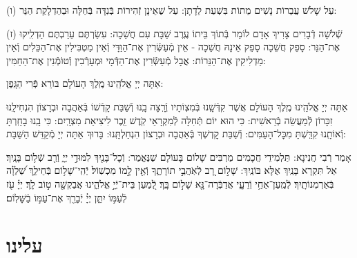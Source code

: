 \documentclass[twoside, openany, parskip=half, 11pt]{book}
\begin{document}
(ו) עַל שָׁלֹשׁ עֲבֵרוֹת נָשִׁים מֵתוֹת בִּשְׁעַת לֵדָתָן: עַל שֶׁאֵינָן זְֿהִירוֹת בְּֿנִדָּה בְּֿחַלָּה וּבְהַדְלָקַת הַנֵּר:

(ז) שְֿׁלֹשָׁה דְֿבָרִים צָרִיךְ אָדָם לוֹמַר בְּֿתוֹךְ בֵּיתוֹ עֶֽרֶב שַׁבָּת עִם חֲשֵׁכָה: עִשַׂרְתֶּם עֵרַבְתֶּם הַדְלִֽיקוּ אֶת־הַנֵּר: סָפֵק חֲשֵׁכָה סָפֵק אֵינָהּ חֲשֵׁכָה - אֵין מְֿעַשְּֿׂרִין אֶת־הַוַּדָּי וְֿאֵין מַטְבִּילִין אֶת־הַכֵּלִים וְֿאֵין מַדְלִיקִין אֶת־הַנֵּרוֹת: אֲבָל מְֿעַשְּֿׂרִין אֶת־הַדְּֿמָי וּמְעָרְֿבִין וְֿטוֹמְֿנִין אֶת־הַחַמִּין:



אַתָּה יְיָ אֱלֹהֵֽינוּ מֶֽלֶךְ הָעוֹלָם בּוֹרֵא פְּֿרִי הַגָּֽפֶן:

אַתָּה יְיָ אֱלֹהֵֽינוּ מֶֽלֶךְ הָעוֹלָם אֲשֶׁר קִדְּֿשָֽׁנוּ בְּֿמִצְוֹתָיו וְֿרָֽצָה בָֽנוּ וְֿשַׁבַּת קָדְֿשׁוֹ בְּֿאַהֲבָה וּבְרָצוֹן הִנְחִילָֽנוּ זִכָּרוֹן לְֿמַעֲשֵׂה בְֿרֵאשִׁית: כִּי הוּא יוֹם תְּֿחִלָּה לְֿמִקְרָאֵי קֹֽדֶשׁ זֵֽכֶר לִיצִיאַת מִצְרָֽיִם: כִּי בָֽנוּ בָחַֽרְתָּ וְֿאוֹתָֽנוּ קִדַּֽשְׁתָּ מִכׇּל־הָעַמִּים: וְֿשַׁבַּת קׇדְשְׁךָ בְּֿאַהֲבָה וּבְרָצוֹן הִנְחַלְתָּֽנוּ: בָּרוּךְ אַתָּה יְיָ מְֿקַדֵּשׁ הַשַּׁבָּת:

\sepline

 
אָמַר רְֿבִי חֲנִינָא: תַּלְמִידֵי חֲכָמִים מַרְבִּים שָׁלוֹם בָּעוֹלָם שֶׁנֶּאֱמַר:
וְֿכׇל־בָּנַ֖יִךְ לִמּוּדֵ֣י יְיָ֑ וְֿרַ֖ב שְֿׁל֥וֹם בָּנָֽיִךְ׃ אַל תִּקְרָא בָּנַֽיִךְ אֶלָּא בּוֹנַֽיִךְ: שָׁל֣וֹם רָ֭ב לְֿאֹֽהֲבֵ֣י תוֹרָתֶ֑ךָ וְֿאֵ֖ין לָ֣מוֹ מִכְשֽׁוֹל׃ יְֿהִֽי־שָׁל֥וֹם בְּֿחֵילֵ֑ךְ שַׁ֝לְוָ֗ה בְּֿאַרְמְנוֹתָֽיִךְ׃  לְֿמַֽעַן־אַחַ֥י וְֿרֵעָ֑י אֲדַבְּֿרָה־נָּ֖א שָׁל֣וֹם בָּֽךְ׃ לְֿ֭מַעַן בֵּית־יְֿיָ֣ אֱלֹהֵ֑ינוּ אֲבַקְשָׁ֖ה ט֣וֹב לָֽךְ׃
יְיָ֗ עֹ֖ז לְֿעַמּ֣וֹ יִתֵּ֑ן יְיָ֓ יְֿבָרֵ֖ךְ אֶת־עַמּ֣וֹ בַֿשָּׁלֽוֹם׃


\mournerskaddish

\section*{ עלינו }
\aleinu



\end{document}
